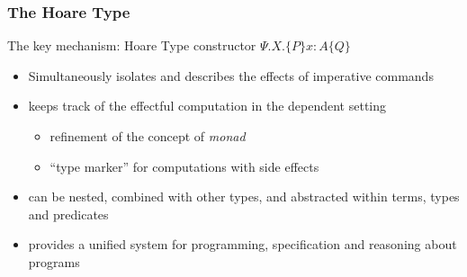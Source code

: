 \documentclass[xcolor=dvipsnames,9pt,hide notes,mathserif]{beamer}
\begin{document}
\begin{frame}
  \frametitle{The Hoare Type}
  The key mechanism: Hoare Type constructor $\Psi.X.\{P\}x:A\{Q\}$ 
  \begin{itemize}
  \item Simultaneously isolates and describes the effects of imperative commands
  \item keeps track of the effectful computation in the dependent setting
    \begin{itemize}
    \item  refinement of the concept of \textit{monad}
    \item ``type marker'' for computations with side effects
    \end{itemize}
    \item can be nested, combined with other types, and abstracted
      within terms, types and predicates
\item provides a unified system for programming, specification and
  reasoning about programs
  \end{itemize}
\end{frame}


\end{document}
